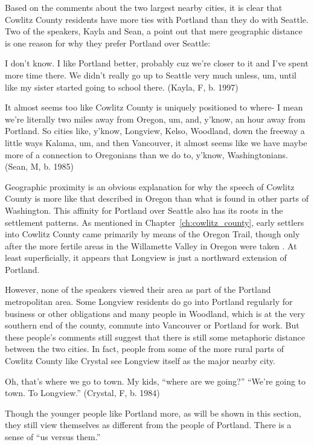 Based on the comments about the two largest nearby cities, it is clear that Cowlitz County residents have more ties with Portland than they do with Seattle. Two of the speakers, Kayla and Sean, a point out that mere geographic distance is one reason for why they prefer Portland over Seattle:
\begin{num_quote}
    I don't know. I like Portland better, probably cuz we're closer to it and I've spent more time there. We didn't really go up to Seattle very much unless, um, until like my sister started going to school there. (Kayla, F, b. 1997)
    \label{quote:i_like_portland_better}
\end{num_quote}
\begin{num_quote}
    It almost seems too like Cowlitz County is uniquely positioned to where- I mean we're literally two miles away from Oregon, um, and, y'know, an hour away from Portland. So cities like, y'know, Longview, Kelso, Woodland, down the freeway a little ways Kalama, um, and then Vancouver, it almost seems like we have maybe more of a connection to Oregonians than we do to, y'know, Washingtonians. (Sean, M, b. 1985)
    \label{quote:connection_to_oregonians}
\end{num_quote}
Geographic proximity is an obvious explanation for why the speech of Cowlitz County is more like that described in Oregon than what is found in other parts of Washington. This affinity for Portland over Seattle also has its roots in the settlement patterns. As mentioned in Chapter~\ref{ch:cowlitz_county}, early settlers into Cowlitz County came primarily by means of the Oregon Trail, though only after the more fertile areas in the Willamette Valley in Oregon were taken \citep[37]{urrutia_1998}. At least superficially, it appears that Longview is just a northward extension of Portland.

However, none of the speakers viewed their area as part of the Portland metropolitan area. Some Longview residents do go into Portland regularly for business or other obligations and many people in Woodland, which is at the very southern end of the county, commute into Vancouver or Portland for work. But these people's comments still suggest that there is still some metaphoric distance between the two cities. In fact, people from some of the more rural parts of Cowlitz County like Crystal see Longview itself as the major nearby city.
\begin{num_quote}
    Oh, that's where we go to town. My kids, ``where are we going?'' ``We're going to town. To Longview.'' (Crystal, F, b. 1984)
    \label{quote:go_to_town}
\end{num_quote}
Though the younger people like Portland more, as will be shown in this section, they still view themselves as different from the people of Portland. There is a sense of ``us versus them.''

